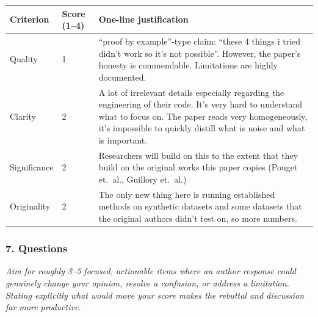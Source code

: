\begin{center}
\begin{tabular}{@{}P{0.16\textwidth}P{0.12\textwidth}P{0.60\textwidth}@{}}
\toprule
\textbf{Criterion} & \textbf{Score (1--4)} & \textbf{One-line justification} \\
\midrule
Quality & 1 & ``proof by example''-type claim: ``these 4 things i tried didn't
work so it's not possible''. However, the paper's honesty is commendable.
Limitations are highly documented. \\
Clarity & 2 & A lot of irrelevant details especially regarding the engineering
of their code. It's very hard to understand what to focus on. The paper reads
very homogeneously, it's impossible to quickly distill what is noise and what
is important. \\
Significance & 2 & Researchers will build on this to the extent that they build
on the original works this paper copies (Pouget et.\ al., Guillory et.\ al.) \\
Originality & 2 & The only new thing here is running established methods on
synthetic datasets and some datasets that the original authors didn't test on,
so more numbers. \\
\bottomrule
\end{tabular}
\end{center}
\subsubsection*{7. Questions}
{\itshape Aim for roughly 3--5 focused, actionable items where an author
response could genuinely change your opinion, resolve a confusion, or address a
limitation. Stating explicitly what would move your score makes the rebuttal
and discussion far more productive.}

